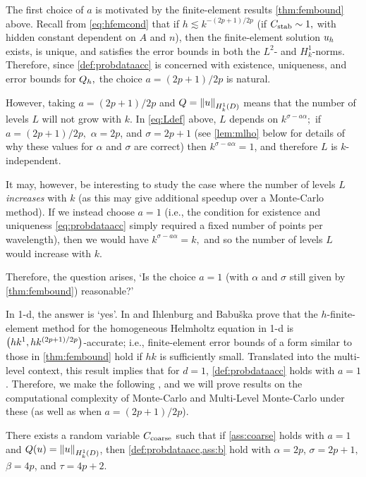 The first choice of $a$ is motivated by the finite-element results \cref{thm:fembound} above. Recall from \cref{eq:hfemcond} that if $h \lesssim k^{-(2p+1)/2p}$ (if $C_{\mathrm{stab}} \sim 1,$ with hidden constant dependent on $A$ and $n$), then the finite-element solution $u_{h}$ exists, is unique, and satisfies the error bounds in both the $L^2$- and $H^1_k$-norms. Therefore, since \cref{def:probdataacc} is concerned with existence, uniqueness, and error bounds for $Q_{h},$ the choice $a=(2p+1)/2p$ is natural.

However, taking $a=(2p+1)/2p$ and $Q = \NHokD{u}$ means that the number of levels $L$ will not grow with $k.$ In \cref{eq:Ldef} above, $L$ depends on $k^{\sigma-a\alpha};$ if $a=(2p+1)/2p,$ $\alpha = 2p$, and $\sigma = 2p+1$ (see \cref{lem:mlho} below for details of why these values for $\alpha$ and $\sigma$ are correct) then $k^{\sigma-a\alpha} = 1$, and therefore $L$ is $k$-independent.

It may, however, be interesting to study the case where the number of levels $L$ \emph{increases} with $k$ (as this may give additional speedup over a Monte-Carlo method). If we instead choose $a=1$ (i.e., the condition for existence and uniqueness \cref{eq:probdataacc} simply required a fixed number of points per wavelength), then we would have $k^{\sigma - a\alpha} = k,$ and so the number of levels $L$ would increase with $k.$ 

Therefore, the question arises, `Is the choice $a=1$ (with $\alpha$ and $\sigma$ still given by \cref{thm:fembound}) reasonable?'

In 1-d, the answer is `yes'. In \cite[Corollary 3.2]{IhBa:97} and \cite[Theorem 4.27 and equation 4.7.41]{Ih:98} Ihlenburg and Babu\v{s}ka prove that the $h$-finite-element method for the homogeneous Helmholtz equation in 1-d is $\hk{1}{(2p+1)/2p}$-accurate; i.e., finite-element error bounds of a form similar to those in \cref{thm:fembound} hold if $hk$ is sufficiently small. Translated into the multi-level context, this result implies that for $d=1$, \cref{def:probdataacc} holds with $a=1$. Therefore, we make the following , and we will prove results on the computational complexity of Monte-Carlo and Multi-Level Monte-Carlo under these  (as well as when $a=(2p+1)/2p$).

\bas[Assumptions for $Q(u) = \NHokD{u}$ with $a=1$]\label{ass:mlho}
There exists a random variable $C_{\mathrm{coarse}}$ such that if \cref{ass:coarse} holds with $a = 1$ and $Q(u) = \NHokD{u}$, then \cref{def:probdataacc,ass:b} hold with $\alpha = 2p$, $\sigma = 2p+1,$ $\beta = 4p$, and $\tau = 4p+2$.
\eas

